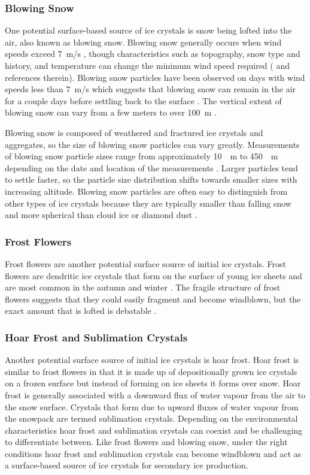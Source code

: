 \subsubsection{Blowing Snow}
One potential surface-based source of ice crystals is snow being lofted into the air, also known as blowing snow. Blowing snow generally occurs when wind speeds exceed \SI{7}{m/s} \citep{lach2010}, though characteristics such as topography, snow type and history, and temperature can change the minimum wind speed required (\cite{li1997, mah2003} and references therein). Blowing snow particles have been observed on days with wind speeds less than \SI{7}{m/s} which suggests that blowing snow can remain in the air for a couple days before settling back to the surface \citep{wald2003, lach2010}. The vertical extent of blowing snow can vary from a few meters to over \SI{100}{m} \citep{wald2003,palm2011}.

Blowing snow is composed of weathered and fractured ice crystals and aggregates, so the size of blowing snow particles can vary greatly. Measurements of blowing snow particle sizes range from approximately \SI{10}{\mu m} to \SI{450}{\mu m} depending on the date and location of the measurements \citep[e.g.][]{mah2003,nish2005,gord2009}. Larger particles tend to settle faster, so the particle size distribution shifts towards smaller sizes with increasing altitude. Blowing snow particles are often easy to distinguish from other types of ice crystals because they are typically smaller than falling snow and more spherical than cloud ice or diamond dust \citep{nish2005,lach2010}.

\subsubsection{Frost Flowers}
Frost flowers are another potential surface source of initial ice crystals. Frost flowers are dendritic ice crystals that form on the surface of young ice sheets and are most common in the autumn and winter \citep{domi2005, style2009}. The fragile structure of frost flowers suggests that they could easily fragment and become windblown, but the exact amount that is lofted is debatable \citep{rosc2011}.

\subsubsection{Hoar Frost and Sublimation Crystals}
Another potential surface source of initial ice crystals is hoar frost. Hoar frost is similar to frost flowers in that it is made up of depositionally grown ice crystals on a frozen surface but instead of forming on ice sheets it forms over snow. Hoar frost is generally associated with a downward flux of water vapour from the air to the snow surface. Crystals that form due to upward fluxes of water vapour from the snowpack are termed sublimation crystals. Depending on the environmental characteristics hoar frost and sublimation crystals can coexist and be challenging to differentiate between. Like frost flowers and blowing snow, under the right conditions hoar frost and sublimation crystals can become windblown and act as a surface-based source of ice crystals for secondary ice production. \citep{gal2014, far2016, feg2018}

